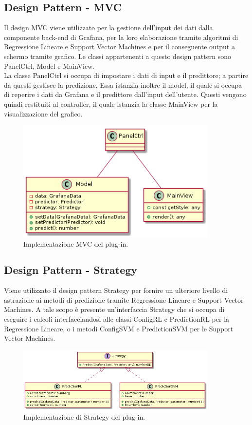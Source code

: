 \documentclass[../manuale-sviluppatore.tex]{subfiles}
\begin{document}
\subsection{Design Pattern - MVC}
Il design MVC viene utilizzato per la gestione dell'input dei dati dalla componente back-end di Grafana, per la loro elaborazione tramite algoritmi di Regressione Lineare e Support Vector Machines e per il conseguente output a schermo tramite grafico. Le classi appartenenti a questo design pattern sono PanelCtrl, Model e MainView. \\
La classe PanelCtrl si occupa di impostare i dati di input e il predittore; a partire da questi gestisce la predizione. Essa istanzia inoltre il model, il quale si occupa di reperire i dati da Grafana e il predittore dall'input dell'utente. Questi vengono quindi restituiti al controller, il quale istanzia la classe MainView per la visualizzazione del grafico.

\begin{figure}[H]
  \centering
  \includegraphics[width=10cm]{img/plugin/mvcplugin.png}
  \caption{Implementazione MVC del plug-in.}
\end{figure}

\subsection{Design Pattern - Strategy}
Viene utilizzato il design pattern Strategy per fornire un ulteriore livello di astrazione ai metodi di predizione tramite Regressione Lineare e Support Vector Machines.
A tale scopo è presente un'interfaccia Strategy che si occupa di eseguire i calcoli interfacciandosi alle classi ConfigRL e PredictionRL per la Regressione Lineare,
o i metodi ConfigSVM e PredictionSVM per le Support Vector Machines. \\

\begin{figure}[H]
  \centering
  \includegraphics[width=10cm]{img/plugin/strategy.png}
  \caption{Implementazione di Strategy del plug-in.}
\end{figure}
\end{document}
